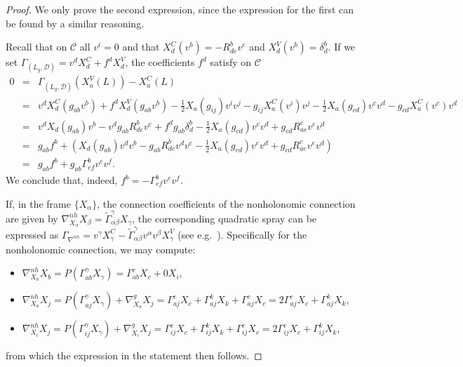 \documentclass[11pt]{article}
\begin{document}
\begin{proof} We only prove the second expression, since the expression for the first can be found by a similar reasoning. 

 Recall that on $\mathcal{C}$  all $v^i=0$ and that 
$X_d^C(v^b)=-R_{de}^b v^e$ and $X_d^V(v^b)=\delta^b_d$. 
If we set $\Gamma_{(L_g, \mathcal{D})}=v^{d} X_{d}^{C}+f^d  X_{d}^{V}$, the coefficients $f^d$ satisfy on $\mathcal{C}$
\begin{eqnarray*}
0&=& \Gamma_{(L_g,\mathcal{D})}\left(X_{a}^{V}(L)\right)-X_{a}^{C}(L)\\
&=& v^{d} X^C_{d} (g_{a b} v^{b})+f^d X_d^V(g_{ab}v^b)-\frac{1}{2}X_a(g_{ij})v^iv^j-g_{ij}X_a^C(v^i)v^j -\frac{1}{2}X_a(g_{cd})v^cv^d -g_{cd}X_a^C(v^c)v^d\\
&=& v^{d} X_{d}\left(g_{a b}\right) v^{b}-v^{d} g_{a b} R_{d e}^{b} v^{e}+f^{d} g_{a b} \delta_{d}^{b}-\frac{1}{2} X_{a}\left(g_{c d}\right) v^{c} v^{d}  +g_{c d} R_{a e}^{c} v^{e} v^{d} 
\\
& =& g_{a b} f^{b}+\left(X_{d}\left(g_{a b}\right) v^{d} v^{b}-g_{a b} R_{d e}^{b} v^{d} v^e -\frac{1}{2} X_{a}\left(g_{c d}\right) v^{c}v^{d}  +g_{cd}R^c_{ae}v^ev^d\right) \\
& =& g_{a b} f^{b}+g_{a b} \Gamma_{ef}^{b} v^{e} v^{f}.
\end{eqnarray*}
We conclude that, indeed, $f^{b}=-\Gamma_{ef}^{b} v^{e} v^{f}$.

If, in the frame $\{X_\alpha\}$, the connection coefficients of the nonholonomic connection are given by  $\nabla^{nh}_{X_\alpha} X_\beta =
\tilde{\Gamma}_{\alpha \beta}^\gamma X_\gamma$, the corresponding quadratic spray can be expressed as $
\Gamma_{\nabla^{nh}}=v^\gamma X_\gamma^C-\tilde{\Gamma}_{\alpha \beta}^\gamma v^\alpha v^\beta X_\gamma^V$ (see e.g.\ \cite{reductionsodes}).
Specifically for the nonholonomic connection, we may compute:
\begin{itemize}
\item $\nabla^{nh}_{X_a}X_b=P(\Gamma_{ab}^\gamma X_\gamma)=\Gamma_{ab}^c X_c+0X_i$,

\item $\nabla_{X_a}^{nh} X_j=P\left(\Gamma_{a j}^\gamma X_\gamma\right)+\nabla_{X_a}^g X_j=\Gamma_{a j}^c X_c+\Gamma_{a j}^k X_k+\Gamma_{a j}^c X_c 
 =2 \Gamma_{a j}^c X_c+\Gamma_{a j}^k X_k $,

\item $\nabla_{X_i}^{nh} X_j=P\left(\Gamma_{ij}^\gamma X_\gamma\right)+\nabla_{X_i}^g X_j=\Gamma_{ij}^c X_{c} +\Gamma_{ij}^k X_k+\Gamma_{ij}^c X_c
=2 \Gamma_{ij}^c X_c+\Gamma_{ij}^k X_k$,
\end{itemize}
from which the  expression in the statement then follows.
\end{proof}
\end{document}
